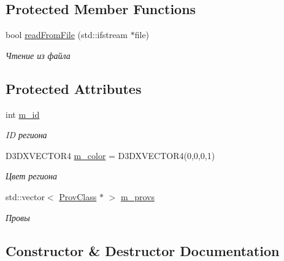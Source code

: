 \subsection*{Protected Member Functions}
\begin{DoxyCompactItemize}
\item 
bool \hyperlink{class_prov_region_class_ae6a10139f79ab3a22d28422b433f588b}{read\+From\+File} (std\+::ifstream $\ast$file)
\begin{DoxyCompactList}\small\item\em Чтение из файла \end{DoxyCompactList}\end{DoxyCompactItemize}
\subsection*{Protected Attributes}
\begin{DoxyCompactItemize}
\item 
int \hyperlink{class_prov_region_class_a507b91b7ae0374d4e4b0816dc3dc0c62}{m\+\_\+id}
\begin{DoxyCompactList}\small\item\em ID региона \end{DoxyCompactList}\item 
D3\+D\+X\+V\+E\+C\+T\+O\+R4 \hyperlink{class_prov_region_class_a8782e9c8135dbf5f89f0b0b64649a129}{m\+\_\+color} = D3\+D\+X\+V\+E\+C\+T\+O\+R4(0,0,0,1)
\begin{DoxyCompactList}\small\item\em Цвет региона \end{DoxyCompactList}\item 
std\+::vector$<$ \hyperlink{class_prov_class}{Prov\+Class} $\ast$ $>$ \hyperlink{class_prov_region_class_a2597561e1bac7e8514c57e9db3620e17}{m\+\_\+provs}
\begin{DoxyCompactList}\small\item\em Провы \end{DoxyCompactList}\end{DoxyCompactItemize}


\subsection{Constructor \& Destructor Documentation}
\mbox{\label{class_prov_region_class_a82d964ce146ae6e8cdc6196d71ab0e14}} 
